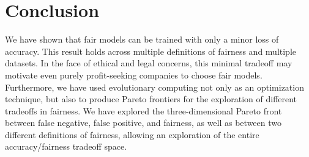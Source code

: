 \documentclass[twoside]{article}
\begin{document}
\section{Conclusion}
We have shown that fair models can be trained with only a minor loss of accuracy. This result holds across multiple definitions of fairness and multiple datasets. In the face of ethical and legal concerns, this minimal tradeoff may motivate even purely profit-seeking companies to choose fair models. Furthermore, we have used evolutionary computing not only as an optimization technique, but also to produce Pareto frontiers for the exploration of different tradeoffs in fairness. We have explored the three-dimensional Pareto front between false negative, false positive, and fairness, as well as between two different definitions of fairness, allowing an exploration of the entire accuracy/fairness tradeoff space.
 




\end{document}
